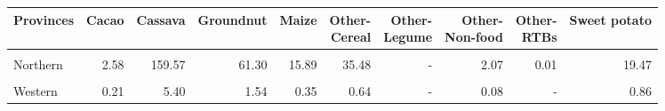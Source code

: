 \begin{table}[!h]
\centering\begingroup\fontsize{7}{9}\selectfont

\begin{tabular}{>{\raggedright\arraybackslash}p{1.8cm}rrrrrrrrr}
\toprule
Provinces & Cacao & Cassava & Groundnut & Maize & \makecell{Other-\\Cereal} & \makecell{Other-\\Legume} & \makecell{Other-\\Non-food} & \makecell{Other-\\RTBs} & Sweet potato\\
\midrule
\cellcolor{gray!10}{Eastern} & \cellcolor{gray!10}{31.11} & \cellcolor{gray!10}{70.67} & \cellcolor{gray!10}{15.67} & \cellcolor{gray!10}{7.12} & \cellcolor{gray!10}{7.40} & \cellcolor{gray!10}{0.09} & \cellcolor{gray!10}{8.49} & \cellcolor{gray!10}{-} & \cellcolor{gray!10}{8.83}\\
Northern & 2.58 & 159.57 & 61.30 & 15.89 & 35.48 & - & 2.07 & 0.01 & 19.47\\
\cellcolor{gray!10}{Southern} & \cellcolor{gray!10}{8.19} & \cellcolor{gray!10}{149.04} & \cellcolor{gray!10}{27.41} & \cellcolor{gray!10}{10.60} & \cellcolor{gray!10}{16.94} & \cellcolor{gray!10}{-} & \cellcolor{gray!10}{4.01} & \cellcolor{gray!10}{-} & \cellcolor{gray!10}{10.80}\\
Western & 0.21 & 5.40 & 1.54 & 0.35 & 0.64 & - & 0.08 & - & 0.86\\
\bottomrule
\end{tabular}
\endgroup{}
\end{table}

